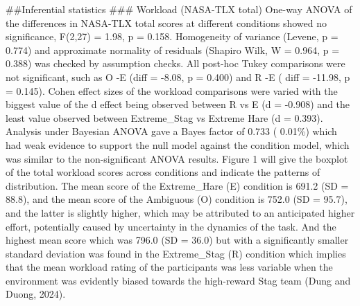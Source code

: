 \documentclass[
]{article}
\newenvironment{Shaded}{\begin{snugshade}}{\end{snugshade}}
\newcommand{\AttributeTok}[1]{\textcolor[rgb]{0.13,0.29,0.53}{#1}}
\newcommand{\CommentTok}[1]{\textcolor[rgb]{0.56,0.35,0.01}{\textit{#1}}}
\newcommand{\FunctionTok}[1]{\textcolor[rgb]{0.13,0.29,0.53}{\textbf{#1}}}
\newcommand{\NormalTok}[1]{#1}
\newcommand{\OtherTok}[1]{\textcolor[rgb]{0.56,0.35,0.01}{#1}}
\newcommand{\SpecialCharTok}[1]{\textcolor[rgb]{0.81,0.36,0.00}{\textbf{#1}}}
\begin{document}
\#\#Inferential statistics \#\#\# Workload (NASA-TLX total) One-way
ANOVA of the differences in NASA-TLX total scores at different
conditions showed no significance, F(2,27) = 1.98, p = 0.158.
Homogeneity of variance (Levene, p = 0.774) and approximate normality of
residuals (Shapiro Wilk, W = 0.964, p = 0.388) was checked by assumption
checks. All post-hoc Tukey comparisons were not significant, such as O
-E (diff = -8.08, p = 0.400) and R -E ( diff = -11.98, p = 0.145). Cohen
effect sizes of the workload comparisons were varied with the biggest
value of the d effect being observed between R vs E (d = -0.908) and the
least value observed between Extreme\_Stag vs Extreme Hare (d = 0.393).
Analysis under Bayesian ANOVA gave a Bayes factor of 0.733 ( 0.01\%)
which had weak evidence to support the null model against the condition
model, which was similar to the non-significant ANOVA results. Figure 1
will give the boxplot of the total workload scores across conditions and
indicate the patterns of distribution. The mean score of the
Extreme\_Hare (E) condition is 691.2 (SD = 88.8), and the mean score of
the Ambiguous (O) condition is 752.0 (SD = 95.7), and the latter is
slightly higher, which may be attributed to an anticipated higher
effort, potentially caused by uncertainty in the dynamics of the task.
And the highest mean score which was 796.0 (SD = 36.0) but with a
significantly smaller standard deviation was found in the Extreme\_Stag
(R) condition which implies that the mean workload rating of the
participants was less variable when the environment was evidently biased
towards the high-reward Stag team (Dung and Duong, 2024).

\begin{Shaded}
\end{Shaded}
\end{document}
